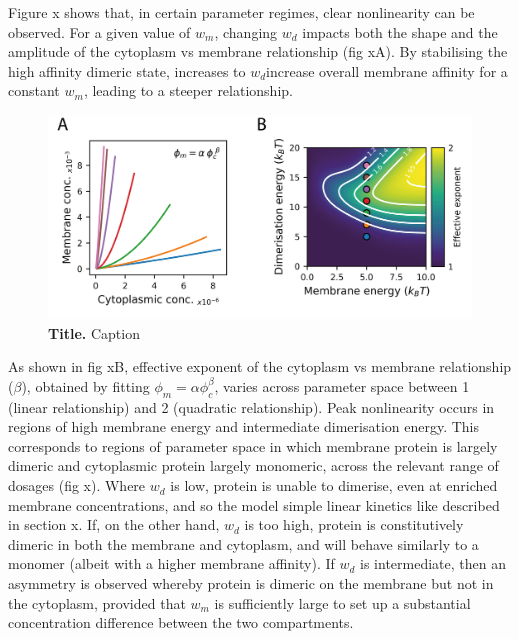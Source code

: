 \documentclass[12pt]{"article"}
\newcommand{\mycaption}[2]{\caption[#1]{\textbf{#1.} #2}}
\begin{document}
Figure x shows that, in certain parameter regimes, clear nonlinearity can be observed. For a given value of $w_m$, changing $w_d$ impacts both the shape and the amplitude of the cytoplasm vs membrane relationship (fig xA). By stabilising the high affinity dimeric state, increases to $w_d $increase overall membrane affinity for a constant $w_m$, leading to a steeper relationship. \\

\begin{figure}[!h]
\includegraphics[scale=1]{thermodynamic_model_feedback}
\setlength{\abovecaptionskip}{20pt}
\centering
\mycaption{Title}{Caption}
\label{fig:thermodynamic_model_feedback}
\end{figure}

As shown in fig xB, effective exponent of the cytoplasm vs membrane relationship ($\beta$), obtained by fitting $\phi_m = \alpha \phi_c^{\beta}$, varies across parameter space between 1 (linear relationship) and 2 (quadratic relationship). Peak nonlinearity occurs in regions of high membrane energy and intermediate dimerisation energy. This corresponds to regions of parameter space in which membrane protein is largely dimeric and cytoplasmic protein largely monomeric, across the relevant range of dosages (fig x). Where $w_d$ is low, protein is unable to dimerise, even at enriched membrane concentrations, and so the model simple linear kinetics like described in section x. If, on the other hand, $w_d$ is too high, protein is constitutively dimeric in both the membrane and cytoplasm, and will behave similarly to a monomer (albeit with a higher membrane affinity). If $w_d$ is intermediate, then an asymmetry is observed whereby protein is dimeric on the membrane but not in the cytoplasm, provided that $w_m$ is sufficiently large to set up a substantial concentration difference between the two compartments.\\
\end{document}
